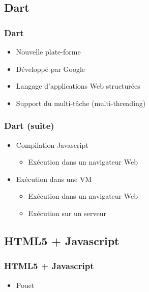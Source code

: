   \subsection*{Dart}
    \begin{frame}
      \frametitle{Dart}
      \begin{itemize}
        \item Nouvelle plate-forme
        \item Développé par Google
        \item Langage d'applications Web structurées
        \item Support du multi-tâche (multi-threading)
      \end{itemize}
    \end{frame}
    \begin{frame}
      \frametitle{Dart (suite)}
      \begin{itemize}
        \item Compilation Javascript
        \begin{itemize}
          \item Exécution dans un navigateur Web
        \end{itemize}
        \item Exécution dans une VM
        \begin{itemize}
          \item Exécution dans un navigateur Web
          \item Exécution sur un serveur
        \end{itemize}
      \end{itemize}
    \end{frame}

  \subsection*{HTML5 + Javascript}
    \begin{frame}
      \frametitle{HTML5 + Javascript}
      \begin{itemize}
        \item Pouet
      \end{itemize}
    \end{frame}

